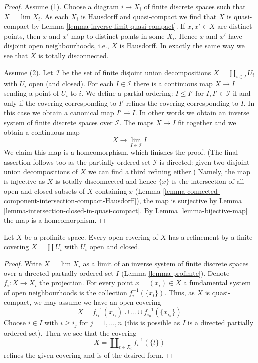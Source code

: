 \begin{proof}
Assume (1). Choose a diagram $i \mapsto X_i$ of finite discrete spaces
such that $X = \lim X_i$. As each $X_i$ is Hausdorff and quasi-compact we find
that $X$ is quasi-compact by Lemma \ref{lemma-inverse-limit-quasi-compact}.
If $x, x' \in X$ are distinct points, then $x$ and $x'$ map to
distinct points in some $X_i$. Hence $x$ and $x'$ have disjoint
open neighbourhoods, i.e., $X$ is Hausdorff. In exactly the same way
we see that $X$ is totally disconnected.

\medskip\noindent
Assume (2). Let $\mathcal{I}$ be the set of finite disjoint union
decompositions $X = \coprod_{i \in I} U_i$ with $U_i$ open (and closed).
For each $I \in \mathcal{I}$ there is a continuous map
$X \to I$ sending a point of $U_i$ to $i$. We define a partial
ordering: $I \leq I'$ for $I, I' \in \mathcal{I}$ if and only
if the covering corresponding to $I'$ refines the covering corresponding
to $I$. In this case we obtain a canonical map $I' \to I$. In other
words we obtain an inverse system of finite discrete spaces over $\mathcal{I}$.
The maps $X \to I$ fit together and we obtain a continuous map
$$
X \longrightarrow \lim_{I \in \mathcal{I}} I
$$
We claim this map is a homeomorphism, which finishes the proof.
(The final assertion follows too as the partially ordered set
$\mathcal{I}$ is directed: given two disjoint union decompositions
of $X$ we can find a third refining either.)
Namely, the map is injective as $X$ is totally disconnected
and hence $\{x\}$ is the intersection of all open and closed subsets
of $X$ containing $x$
(Lemma \ref{lemma-connected-component-intersection-compact-Hausdorff}),
the map is surjective by
Lemma \ref{lemma-intersection-closed-in-quasi-compact}.
By Lemma \ref{lemma-bijective-map} the map is a homeomorphism.
\end{proof}

\begin{lemma}
\label{lemma-profinite-refine-open-covering}
Let $X$ be a profinite space. Every open covering of $X$ has a refinement
by a finite covering $X = \coprod U_i$ with $U_i$ open and closed.
\end{lemma}

\begin{proof}
Write $X = \lim X_i$ as a limit of an inverse system of finite discrete
spaces over a directed partially ordered set $I$ (Lemma \ref{lemma-profinite}).
Denote $f_i : X \to X_i$ the projection.
For every point $x = (x_i) \in X$ a fundamental system of open neighbourhoods
is the collection $f_i^{-1}(\{x_i\})$. Thus, as $X$ is quasi-compact, we may
assume we have an open covering
$$
X = f_{i_1}^{-1}(x_{i_1}) \cup \ldots \cup f_{i_n}^{-1}(\{x_{i_n}\})
$$
Choose $i \in I$ with $i \geq i_j$ for $j = 1, \ldots, n$ (this is possible
as $I$ is a directed partially ordered set). Then we see
that the covering
$$
X = \coprod\nolimits_{t \in X_i} f_i^{-1}(\{t\})
$$
refines the given covering and is of the desired form.
\end{proof}

